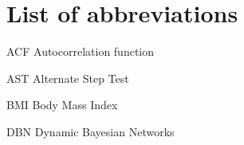 \section*{List of abbreviations}

\begin{abbrv}
\item[ACF]                   Autocorrelation function
\item[AST]                   Alternate Step Test
\item[BMI]                   Body Mass Index
\item[DBN]                   Dynamic Bayesian Networks
\
\end{abbrv}
